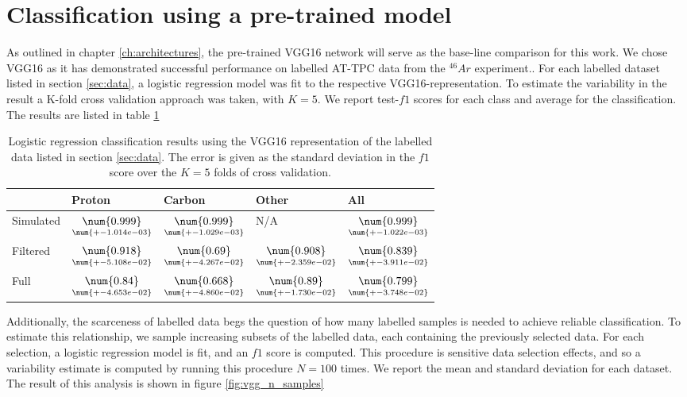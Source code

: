\section{Classification using a pre-trained model}

As outlined in chapter \ref{ch:architectures}, the pre-trained VGG16 network will serve as the base-line comparison for this work. We chose VGG16 as it has demonstrated successful performance on labelled AT-TPC data from the $^{46}Ar$ experiment.\cite{Kuchera2019}. For each labelled dataset listed in section \ref{sec:data}, a logistic regression model was fit to the respective VGG16-representation. To estimate the variability in the result a K-fold cross validation approach was taken, with $K=5$. We report test-$f1$ scores for each class and average for the classification. The results are listed in table \ref{tab:vgg_results}

\begin{table}
\centering
\caption[VGG classification results]{Logistic regression classification results using the VGG16 representation of the labelled data listed in section \ref{sec:data}. The error is given as the standard deviation in the $f1$ score over the $K=5$ folds of cross validation.}\label{tab:vgg_results}
\begin{tabular}{lllll}
\toprule
{} & Proton & Carbon & Other & All \\
\midrule
Simulated &  $\underset{\num{+- 1.014e-03 }  }{\num{ 0.999 } }$ &  $\underset{\num{+- 1.029e-03 }  }{\num{ 0.999 } }$ &  N/A &  $\underset{\num{+- 1.022e-03 }  }{\num{ 0.999 } }$ \\
Filtered  &  $\underset{\num{+- 5.108e-02 }  }{\num{ 0.918 } }$ &  $\underset{\num{+- 4.267e-02 }  }{\num{ 0.69 } }$ &  $\underset{\num{+- 2.359e-02 }  }{\num{ 0.908 } }$ &  $\underset{\num{+- 3.911e-02 }  }{\num{ 0.839 } }$ \\
Full      &  $\underset{\num{+- 4.653e-02 }  }{\num{ 0.84 } }$ &  $\underset{\num{+- 4.860e-02 }  }{\num{ 0.668 } }$ &  $\underset{\num{+- 1.730e-02 }  }{\num{ 0.89 } }$ &  $\underset{\num{+- 3.748e-02 }  }{\num{ 0.799 } }$ \\
\bottomrule
\end{tabular}
\end{table}

 Additionally, the scarceness of labelled data begs the question of how many labelled samples is needed to achieve reliable classification. To estimate this relationship, we sample increasing subsets of the labelled data, each containing the previously selected data. For each selection, a logistic regression model is fit, and an $f1$ score is computed. This procedure is sensitive data selection effects, and so a variability estimate is computed by running this procedure $N=100$ times. We report the mean and standard deviation for each dataset. The result of this analysis is shown in figure \ref{fig:vgg_n_samples}

